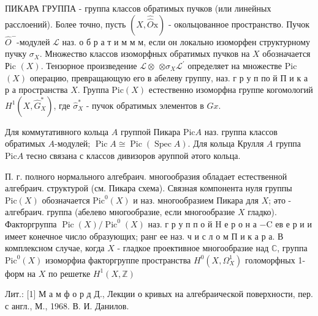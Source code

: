 \documentclass[10pt]{article}
\begin{document}
ПИКАРА ГРУППА - группа классов обратимых пучков (или линейных расслоений). Более точно, пусть $(X, \widehat{\widehat{O}} \mathrm{x})$ - окольцованное пространство. Пучок $\widehat{O}^{-}$-модулей $\mathscr{L}$ наз. о б р а т и м м м, если он локально изоморфен структурному пучку $\sigma_{X}$. Множество классов изоморфных обратимых пучков на $X$ обозначается Рic $(X)$. Тензорное произведение $\mathscr{L} \otimes$ $\otimes \sigma_{X} \mathscr{L}^{\prime}$ определяет на множестве Pic $(X)$ операцию, превращающую его в абелеву группу, наз. г р у п по й П и к а р а пространства $X$. Группа $\mathrm{Pic}(X)$ естественно изоморфна группе когомологий $H^{1}\left(X, \widehat{G}_{X}^{*}\right)$, где $\widehat{\sigma}_{X}^{*}$ - пучок обратимых элементов в $G x$.



Для коммутативного кольца $A$ группой Пикара $\mathrm{Pic} A$ наз. группа классов обратимых $A$-модулей; $\operatorname{Pic} A \cong \operatorname{Pic}(\operatorname{Spec} A)$. Для кольца Крулля $A$ группа $\mathrm{Pic} A$ тесно связана с классов дивизоров әруппой әтого кольца.



П. г. полного нормального алгебраич. многообразия обладает естественной алгебраич. структурой (см. Пикара схема). Связная компонента нуля группы $\mathrm{Pic}(X)$ обозначается $\mathrm{Pic}^{0}(X)$ и наз. многообразием Пикара для $X$; әто - алгебраич. группа (абелево многообразие, если многообразие $X$ гладко). Факторгруппа $\operatorname{Pic}(X) / \operatorname{Pic}^{0}(X)$ наз. г р у п п о й $\mathrm{H}$ е р о н а $-\mathrm{C}$ ев е р и и имеет конечное число образующих; ранг ее наз. ч и с л о м П и к а р а. В комплексном случае, когда $X$ - гладкое проективное многообразие над $\mathbb{C}$, группа $\mathrm{Pic}^{0}(X)$ изоморфиа факторгруппе пространства $H^{0}\left(X, \Omega_{X}^{1}\right)$ голоморфных 1-форм на $X$ по решетке $H^{1}(X, \mathbb{Z})$



Лит.: [1] М а м ф о р д Д., Лекции о кривых на алгебраической поверхности, пер. с англ., М., 1968. В. И. Данилов.
\end{document}
